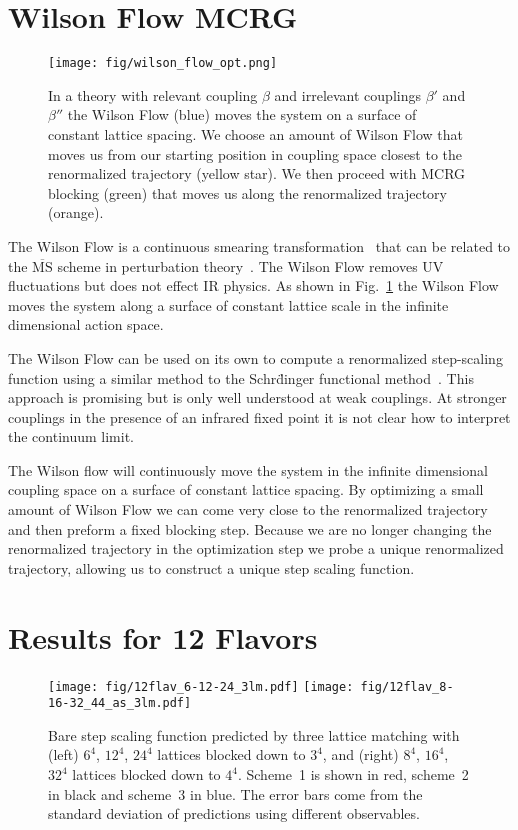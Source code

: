 \documentclass{PoS}
\newcommand{\MSbar}{\ensuremath{\overline{\textrm{MS}} } }
\newcommand{\fig}[1]{Fig.~\ref{#1}}
\begin{document}
\section{Wilson Flow MCRG}
\label{sec:wmcrg}
\begin{figure}[th]
  \centering
  \texttt{[image: fig/wilson\_flow\_opt.png]}
  \caption{In a theory with relevant coupling $\beta$ and irrelevant couplings $\beta'$ and $\beta''$ the Wilson Flow (blue) moves the system on a surface of constant lattice spacing.  We choose an amount of Wilson Flow that moves us from our starting position in coupling space closest to the renormalized trajectory (yellow star).  We then proceed with MCRG blocking (green) that moves us along the renormalized trajectory (orange).}
  \label{fig:wflow_opt}
\end{figure}

The Wilson Flow is a continuous smearing transformation~\cite{Narayanan:2006rf} that can be related to the \MSbar scheme in perturbation theory~\cite{Luscher:2010iy}.
The Wilson Flow removes UV fluctuations but does not effect IR physics.
As shown in \fig{fig:wflow_opt} the Wilson Flow moves the system along a surface of constant lattice scale in the infinite dimensional action space.

The Wilson Flow can be used on its own to compute a renormalized step-scaling function using a similar method to the Schr\"dinger functional method~\cite{Fodor:2012td, Fodor:2012qh}.
This approach is promising but is only well understood at weak couplings.
At stronger couplings in the presence of an infrared fixed point it is not clear how to interpret the continuum limit.

The Wilson flow will continuously move the system in the infinite dimensional coupling space on a surface of constant lattice spacing.
By optimizing a small amount of Wilson Flow we can come very close to the renormalized trajectory and then preform a fixed blocking step.
Because we are no longer changing the renormalized trajectory in the optimization step we probe a unique renormalized trajectory, allowing us to construct a unique step scaling function.



\section{Results for 12 Flavors}
\label{sec:results}
\begin{figure}[ht]
  \texttt{[image: fig/12flav\_6-12-24\_3lm.pdf]}\hfill
  \texttt{[image: fig/12flav\_8-16-32\_44\_as\_3lm.pdf]}
  \caption{Bare step scaling function predicted by three lattice matching with (left) $6^4$, $12^4$, $24^4$ lattices blocked down to $3^4$, and (right) $8^4$, $16^4$, $32^4$ lattices blocked down to $4^4$.  Scheme~1 is shown in red, scheme~2 in black and scheme~3 in blue.  The error bars come from the standard deviation of predictions using different observables.}
\label{fig:multischeme}
\end{figure}
\end{document}
